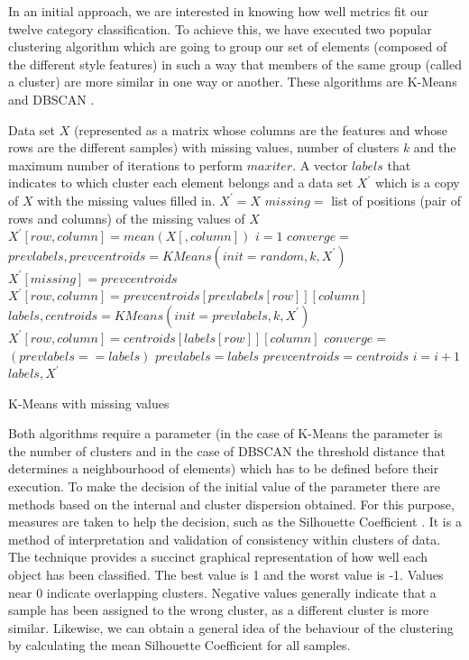 In an initial approach, we are interested in knowing how well metrics fit our twelve category classification. To achieve this, we have executed two popular clustering algorithm which are going to group our set of elements (composed of the different style features) in such a way that members of the same group (called a cluster) are more similar in one way or another. These algorithms are K-Means \citep{hartigan1975clustering} and DBSCAN \citep{ester1996density}.

\begin{algorithm}
	\begin{algorithmic}[1]
		\REQUIRE Data set $X$ (represented as a matrix whose columns are the features and whose rows are the different samples) with missing values, number of clusters $k$ and the maximum number of iterations to perform $maxiter$.
		\ENSURE A vector $labels$ that indicates to which cluster each element belongs and a data set $X^\prime$ which is a copy of $X$ with the missing values filled in.
		\STATE $X^\prime = X$
		\STATE $missing = $ list of positions (pair of rows and columns) of the missing values of $X$
		\STATE $X^\prime[row, column] = mean(X[, column])$
		\ENDFOR
		\STATE $i = 1$
		\STATE $converge =$ \FALSE
		\STATE $prevlabels, prevcentroids = KMeans(init = random, k, X^\prime)$
		\STATE $X^\prime[missing] = prevcentroids$
		\STATE $X^\prime[row, column] = prevcentroids[prevlabels[row]][column]$
		\ENDFOR
		\STATE $labels, centroids = KMeans(init = prevlabels, k, X^\prime)$
		\STATE $X^\prime[row, column] = centroids[labels[row]][column]$
		\ENDFOR
		\STATE $converge =$ $(prevlabels == labels)$
		\STATE $prevlabels = labels$
		\STATE $prevcentroids = centroids$
		\STATE $i = i + 1$
		\ENDIF
		\ENDWHILE
		\RETURN $labels, X^\prime$
	\end{algorithmic}
	\caption{K-Means with missing values}\label{alg:kpod}
\end{algorithm}

Both algorithms require a parameter (in the case of K-Means the parameter is the number of clusters and in the case of DBSCAN the threshold distance that determines a neighbourhood of elements) which has to be defined before their execution. To make the decision of the initial value of the parameter there are methods based on the internal and cluster dispersion obtained. For this purpose, measures are taken to help the decision, such as the Silhouette Coefficient \citep{rousseeuw1987silhouettes}. It is a method of interpretation and validation of consistency within clusters of data. The technique provides a succinct graphical representation of how well each object has been classified. The best value is 1 and the worst value is -1. Values near 0 indicate overlapping clusters. Negative values generally indicate that a sample has been assigned to the wrong cluster, as a different cluster is more similar. Likewise, we can obtain a general idea of the behaviour of the clustering by calculating the mean Silhouette Coefficient for all samples.

